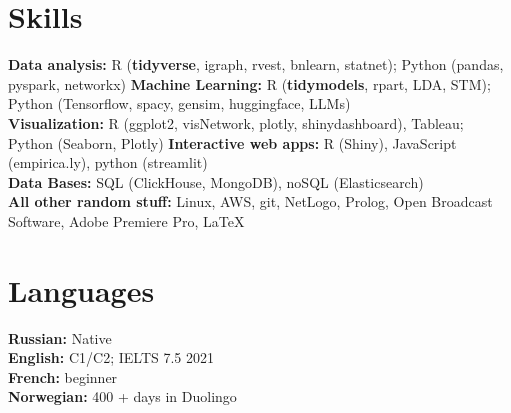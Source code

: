 \documentclass[letterpaper,11pt]{article}
\begin{document}
%
\section{Skills}
 \begin{itemize}[leftmargin=0in, label={}]
    \small{\item{
     \textbf{Data analysis:} {R (\textbf{tidyverse}, igraph, rvest, bnlearn, statnet); Python (pandas, pyspark, networkx)} 
    \textbf{Machine Learning:} {R (\textbf{tidymodels}, rpart, LDA, STM); Python (Tensorflow, spacy, gensim, huggingface, LLMs)} \vspace{2pt} \\
    \textbf{Visualization:} {R (ggplot2, visNetwork, plotly, shinydashboard), Tableau;  Python (Seaborn, Plotly) } 
    \textbf{Interactive web apps:} {R (Shiny), JavaScript (empirica.ly), python (streamlit)} \vspace{2pt} \\
    \textbf{Data Bases:} {SQL (ClickHouse, MongoDB), noSQL (Elasticsearch)} \vspace{2pt} \\
    \textbf{All other random stuff:} {Linux, AWS, git, NetLogo, Prolog, Open Broadcast Software, Adobe Premiere Pro, \LaTeX}
    }}
 \end{itemize}



\section{Languages}
 \begin{itemize}[leftmargin=0in, label={}]
    \small{\item{
     \textbf{Russian:} {Native} \vspace{2pt} \\
     \textbf{English:} {C1/C2; IELTS 7.5 2021} \vspace{2pt} \\
     \textbf{French:} {beginner} \vspace{2pt} \\
    \textbf{Norwegian:} {400 + days in Duolingo} \vspace{2pt} \\
    }}
 \end{itemize}
\end{document}

